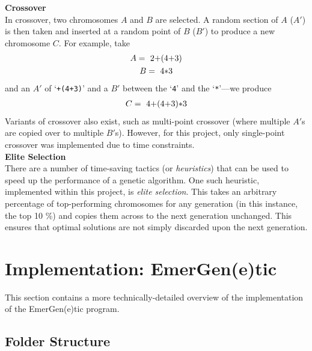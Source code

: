 \documentclass[compsoc,12pt,a4paper]{IEEEtran}
\begin{document}
			\noindent\textbf{Crossover}\\
			
			\noindent In crossover, two chromosomes $A$ and $B$ are selected. A random section of $A$ ($A'$) is then taken and inserted at a random point of $B$ ($B'$) to produce a new chromosome $C$. For example, take
				\begin{gather*}
					A = \text{ \lstinline|2+(4+3)|}\\
					B = \text{ \lstinline|4*3|}
				\end{gather*}
				and an $A'$ of `\lstinline|+(4+3)|' and a $B'$ between the `\lstinline|4|' and the `\lstinline|*|'---we produce
				\begin{gather*}
					C = \text{ \lstinline|4+(4+3)*3|}
				\end{gather*}
				Variants of crossover also exist, such as multi-point crossover (where multiple $A'$s are copied over to multiple $B'$s). However, for this project, only single-point crossover was implemented due to time constraints.\\
				
			\noindent\textbf{Elite Selection}\\
			
			\noindent There are a number of time-saving tactics (or \textit{heuristics}) that can be used to speed up the performance of a genetic algorithm. One such heuristic, implemented within this project, is \textit{elite selection}. This takes an arbitrary percentage of top-performing chromosomes for any generation (in this instance, the top 10 \%) and copies them across to the next generation unchanged. This ensures that optimal solutions are not simply discarded upon the next generation.
		
	\newpage
	
	\section{Implementation: EmerGen(e)tic}
	\label{sec:implementation}
	
		This section contains a more technically-detailed overview of the implementation of the EmerGen(e)tic program.
		
		\subsection{Folder Structure}
		
\end{document}
